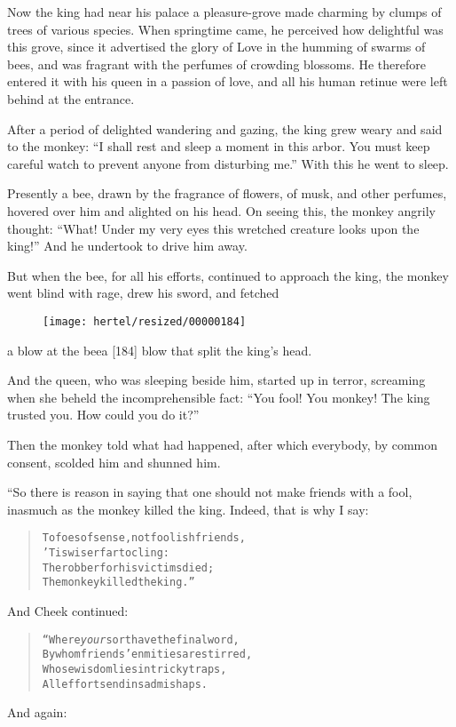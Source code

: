 \documentclass[article, twoside, 10pt]{memoir}
\renewenvironment{verbatim}{%
\begin{quote}%
\vskip -10pt%
\begin{alltt}\normalfont\small}{\end{alltt}%
\end{quote}%
\vskip -10pt
} %
\begin{document}
Now the king had near his palace a pleasure-grove made charming by
clumps of trees of various species. When springtime came, he
perceived how delightful was this grove, since it advertised the
glory of Love in the humming of swarms of bees, and was fragrant
with the perfumes of crowding blossoms. He therefore entered it
with his queen in a passion of love, and all his human retinue were
left behind at the entrance.

After a period of delighted wandering and gazing, the king grew
weary and said to the monkey:
``I shall rest and sleep a moment in this arbor. You must keep careful watch to prevent anyone from disturbing me.''
With this he went to sleep.

Presently a bee, drawn by the fragrance of flowers, of musk, and
other perfumes, hovered over him and alighted on his head. On
seeing this, the monkey angrily thought:
``What! Under my very eyes this wretched creature looks upon the king!''
And he undertook to drive him away.

But when the bee, for all his efforts, continued to approach the
king, the monkey went blind with rage, drew his sword, and fetched
\begin{figure}[p]\texttt{[image: hertel/resized/00000184]}\end{figure}a blow at the bee{\textemdash}a [184] blow that split the king's head.

And the queen, who was sleeping beside him, started up in terror,
screaming when she beheld the incomprehensible fact:
``You fool! You monkey! The king trusted you. How could you do it?''

Then the monkey told what had happened, after which everybody, by
common consent, scolded him and shunned him.

“So there is reason in saying that one should not make friends with
a fool, inasmuch as the monkey killed the king. Indeed, that is why
I say:

\begin{verbatim}
To foes of sense, not foolish friends,
    'Tis wiser far to cling:
The robber for his victims died;
    The monkey killed the king.”
\end{verbatim}
And Cheek continued:

\begin{verbatim}
“Where \emph{your} sort have the final word,
By whom friends' enmities are stirred,
Whose wisdom lies in tricky traps,
All efforts end in sad mishaps.
\end{verbatim}
And again:
\end{document}
